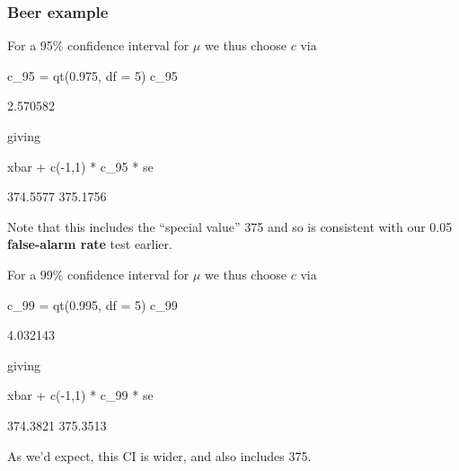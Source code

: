 \documentclass[a4paper]{article}\usepackage[]{graphicx}\usepackage[]{xcolor}
\begin{document}
\subsubsection{Beer example}
\begin{minipage}[t]{0.49\textwidth}
For a 95\% confidence interval for \( \mu \) we thus choose \( c \) via
\begin{Schunk}
\begin{Sinput}
c_95 = qt(0.975, df = 5)
c_95
\end{Sinput}
\begin{Soutput}
[1] 2.570582
\end{Soutput}
\end{Schunk}
giving
\begin{Schunk}
\begin{Sinput}
xbar + c(-1,1) * c_95 * se
\end{Sinput}
\begin{Soutput}
[1] 374.5577 375.1756
\end{Soutput}
\end{Schunk}
Note that this includes the ``special value'' 375 and so is consistent with our 0.05 \textcolor{mygreen}{\textbf{false-alarm rate}} test earlier.
\end{minipage}
\hspace{0.02\textwidth}
\begin{minipage}[t]{0.49\textwidth}
For a 99\% confidence interval for \( \mu \) we thus choose \( c \) via
\begin{Schunk}
\begin{Sinput}
c_99 = qt(0.995, df = 5)
c_99
\end{Sinput}
\begin{Soutput}
[1] 4.032143
\end{Soutput}
\end{Schunk}
giving
\begin{Schunk}
\begin{Sinput}
xbar + c(-1,1) * c_99 * se
\end{Sinput}
\begin{Soutput}
[1] 374.3821 375.3513
\end{Soutput}
\end{Schunk}
As we'd expect, this CI is wider, and also includes 375.
\end{minipage}
\end{document}

